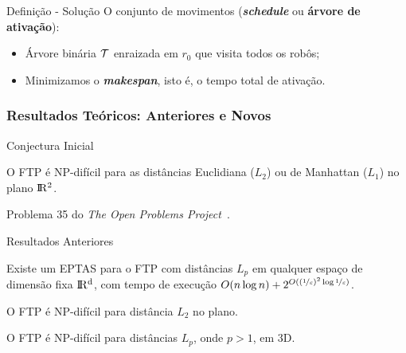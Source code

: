 \stopcounter
\begin{frame}{Definição - Solução}
  O conjunto de movimentos (\textbf{\emph{schedule}} ou \textbf{árvore de ativação}):

  \pause

  \begin{itemize}[<+->]
    \item Árvore binária $\mathcal{T}$ enraizada em $r_0$ que visita todos os robôs;

    \item Minimizamos o \textbf{\emph{makespan}}, isto é, o tempo total de ativação.
  \end{itemize}

  \pause
  \bigskip
  \begin{minipage}{\linewidth}
    \centering
  \end{minipage}
\end{frame}
\inccounter


\subsubsection{Resultados Teóricos: Anteriores e Novos}

\begin{frame}{Conjectura Inicial}
  \begin{conj}
    O FTP é NP-difícil para as distâncias Euclidiana ($L_2$) ou de Manhattan ($L_1$) no plano $\rm I\!R^2$.
  \end{conj}

  \pause
  Problema 35 do \emph{The Open Problems Project}~\cite{TOPP}.
\end{frame}

\begin{frame}{Resultados Anteriores}
  \begin{thm}
    Existe um EPTAS para o FTP com distâncias $L_p$ em qualquer espaço de dimensão fixa $\rm I\!R^d$, com tempo de execução $O(n \log n) + 2^{O((\nicefrac{1}{\varepsilon})^2\log{\nicefrac{1}{\varepsilon}})}$.
  \end{thm}

  \pause
  \begin{thm}
    O FTP é NP-difícil para distância $L_2$ no plano.
  \end{thm}

  \pause
  \begin{thm}
    O FTP é NP-difícil para distâncias $L_p$, onde $p>1$, em 3D.
  \end{thm}
\end{frame}

